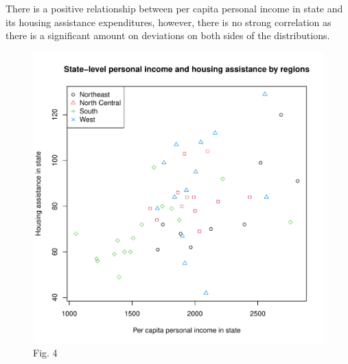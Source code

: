\documentclass[12pt,letterpaper]{article}
\begin{document}
\begin{itemize}
There is a positive relationship between per capita personal income in state and its housing assistance expenditures, however, there is no strong correlation as there is a significant amount on deviations on both sides of the distributions.


\vspace{.2cm}
  
\vspace{.2cm} 

\begin{figure}[H]\centering
\vspace{.2cm}
\includegraphics[height=0.7\textheight]{Babaian-plot4.pdf}
\caption{Fig. 4}
\vspace{.2cm}
\end{figure}

\end{itemize}
\end{document}
